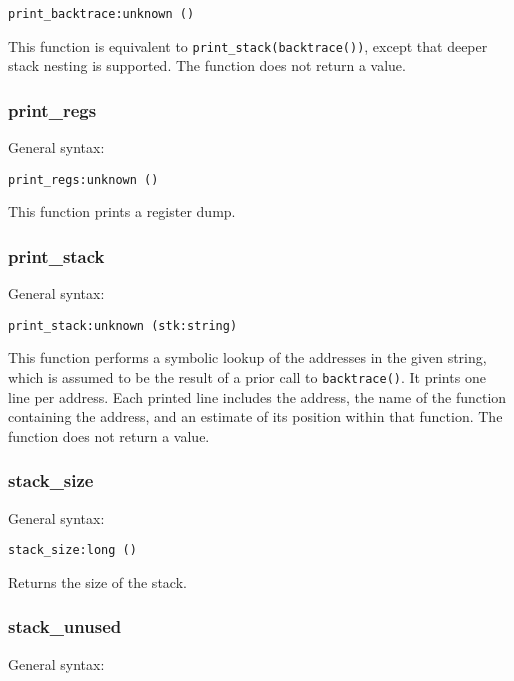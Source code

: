 \documentclass[twoside,english]{article}
\newenvironment{vindent}
{\begin{list}{}{\setlength{\listparindent}{6pt}}
\item[]}
{\end{list}}
\begin{document}
\begin{vindent}
\begin{verbatim}
print_backtrace:unknown ()
\end{verbatim}
\end{vindent}
This function is equivalent to \texttt{print\_stack(backtrace())}, except
that deeper stack nesting is supported. The function does not return a value.


\subsubsection{print\_regs}
General syntax:

\begin{vindent}
\begin{verbatim}
print_regs:unknown ()
\end{verbatim}
\end{vindent}
This function prints a register dump.


\subsubsection{print\_stack}
General syntax:

\begin{vindent}
\begin{verbatim}
print_stack:unknown (stk:string)
\end{verbatim}
\end{vindent}
This function performs a symbolic lookup of the addresses in the given string,
which is assumed to be the result of a prior call to \texttt{backtrace()}.
It prints one line per address. Each printed line includes the address, the
name of the function containing the address, and an estimate of its position
within that function. The function does not return a value.


\subsubsection{stack\_size}
General syntax:

\begin{vindent}
\begin{verbatim}
stack_size:long ()
\end{verbatim}
\end{vindent}
Returns the size of the stack.


\subsubsection{stack\_unused}
General syntax:
\end{document}
